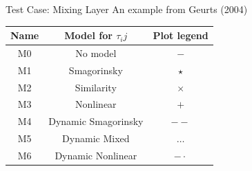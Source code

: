 \begin{frame}{Test Case: Mixing Layer}
An example from Geurts (2004)
\begin{center}
  \begin{tabular}{ c | c | c }\hline\hline
    \textbf{Name} & \textbf{Model for $\tau_ij$} & \textbf{Plot legend} \\ \hline\hline
    M0 & No model & $-$ \\
    M1 & Smagorinsky & $\star$ \\
    M2 & Similarity & $\times$ \\
    M3 & Nonlinear & $+$ \\
    M4 & Dynamic Smagorinsky & $--$ \\
    M5 & Dynamic Mixed & $\ldots$ \\
    M6 & Dynamic Nonlinear & $-\cdot$ \\
    \hline\hline
  \end{tabular}
\end{center}
\end{frame}

